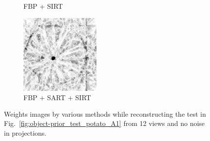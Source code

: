 \documentclass{article}
\begin{document}
\begin{figure}[!h]
\begin{subfigure}[b]{0.2\linewidth}
\captionsetup{labelformat=empty}
        \caption{FBP + SIRT}
    \end{subfigure}
    \quad
        \begin{subfigure}[b]{0.2\linewidth}
        \includegraphics[width=\textwidth]{../images/potato/artefacts/no_noise/weightsIm_fbp_sart_sirt30.png}
\captionsetup{labelformat=empty}
        \caption{FBP + SART + SIRT}
     \end{subfigure}
      \caption{Weights images by various methods while reconstructing the test in Fig.~\ref{fig:object-prior_test_potato_A1} from 12 views and no noise in projections.}
\label{fig:weights_no_noise}
\end{figure}
\end{document}
